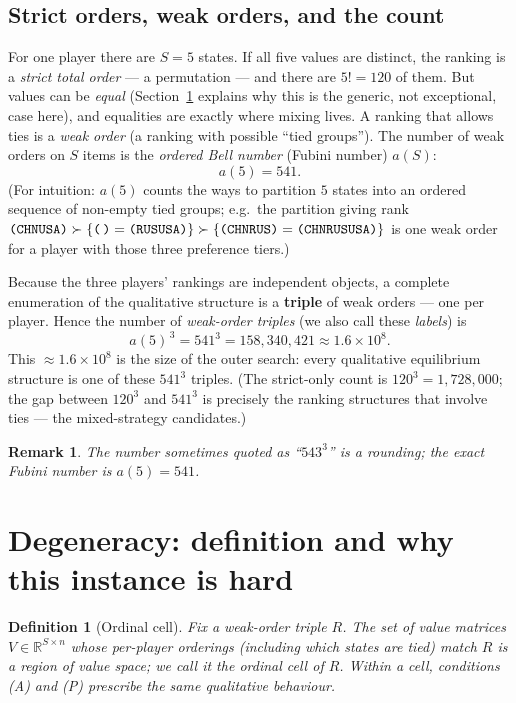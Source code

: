 \documentclass[11pt]{article}
\newcommand{\state}[1]{\texttt{(#1)}}
\newcommand{\empt}{\texttt{(\,)}}
\newcommand{\R}{\mathbb{R}}
\newtheorem{definition}{Definition}
\newtheorem{remark}{Remark}
\begin{document}
\subsection{Strict orders, weak orders, and the count}
For one player there are $S=5$ states. If all five values are distinct, the ranking
is a \emph{strict total order} --- a permutation --- and there are $5!=120$ of them.
But values can be \emph{equal} (Section~\ref{sec:degeneracy} explains why this is the
generic, not exceptional, case here), and equalities are exactly where mixing lives.
A ranking that allows ties is a \emph{weak order} (a ranking with possible
``tied groups''). The number of weak orders on $S$ items is the
\emph{ordered Bell number} (Fubini number) $a(S)$:
\[
a(5)=541 .
\]
(For intuition: $a(5)$ counts the ways to partition $5$ states into an ordered
sequence of non-empty tied groups; e.g.\ the partition giving rank
$\state{CHNUSA}\succ\{\empt=\state{RUSUSA}\}\succ\{\state{CHNRUS}=\state{CHNRUSUSA}\}$
is one weak order for a player with those three preference tiers.)

Because the three players' rankings are independent objects, a complete enumeration
of the qualitative structure is a \textbf{triple} of weak orders --- one per player.
Hence the number of \emph{weak-order triples} (we also call these \emph{labels}) is
\begin{equation}
\label{eq:541cube}
a(5)^{\,3} = 541^3 = 158{,}340{,}421 \approx 1.6\times 10^8 .
\end{equation}
This $\approx 1.6\times 10^8$ is the size of the outer search: every qualitative
equilibrium structure is one of these $541^3$ triples. (The strict-only count is
$120^3 = 1{,}728{,}000$; the gap between $120^3$ and $541^3$ is precisely the
ranking structures that involve ties --- the mixed-strategy candidates.)

\begin{remark}
The number sometimes quoted as ``$543^3$'' is a rounding; the exact Fubini number is
$a(5)=541$.
\end{remark}

\section{Degeneracy: definition and why this instance is hard}
\label{sec:degeneracy}

\begin{definition}[Ordinal cell]
Fix a weak-order triple $R$. The set of value matrices $V\in\R^{S\times n}$ whose
per-player orderings (including which states are tied) match $R$ is a region of value
space; we call it the \emph{ordinal cell} of $R$. Within a cell, conditions (A) and
(P) prescribe the same qualitative behaviour.
\end{definition}
\end{document}
